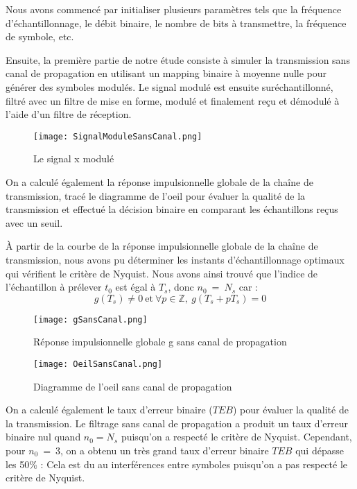 \documentclass[11pt]{article}
\begin{document}
Nous avons commencé par initialiser plusieurs paramètres tels que la fréquence d'échantillonnage, le débit binaire, le nombre de bits à transmettre, la fréquence de symbole, etc.

Ensuite, la première partie de notre étude consiste à simuler la transmission sans canal de propagation en utilisant un mapping binaire à moyenne nulle pour générer des symboles modulés. Le signal modulé est ensuite suréchantillonné, filtré avec un filtre de mise en forme, modulé et finalement reçu et démodulé à l'aide d'un filtre de réception.

\begin{figure}[ht!]
            \centering
            \texttt{[image: SignalModuleSansCanal.png]}
            \caption{Le signal x modulé \label{fig : SignalModuleSansCanal}}
\end{figure}

On a calculé également la réponse impulsionnelle globale de la chaîne de transmission, tracé le diagramme de l'oeil pour évaluer la qualité de la transmission et effectué la décision binaire en comparant les échantillons reçus avec un seuil.

À partir de la courbe de la réponse impulsionnelle globale de la chaîne de transmission, nous avons pu déterminer les instants d'échantillonnage optimaux qui vérifient le critère de Nyquist. Nous avons ainsi trouvé que l'indice de l'échantillon à prélever $t_0$ est égal à $T_s$, donc $n_0 \ = \ N_s$ car :
$$ g(T_s) \neq 0 \
\text{et} \ \forall p \in \mathbb{Z}, \ g(T_s+pT_s) = 0 $$

\begin{figure}[ht!]
            \centering
            \texttt{[image: gSansCanal.png]}
            \caption{Réponse impulsionnelle globale g sans canal de propagation \label{fig : gSansCanal}}
\end{figure}

\begin{figure}[ht!]
            \centering
            \texttt{[image: OeilSansCanal.png]}
            \caption{Diagramme de l'oeil sans canal de propagation\label{fig : OeilSansCanal}}
\end{figure}

On a calculé également le taux d'erreur binaire ($TEB$) pour évaluer la qualité de la transmission. Le filtrage sans canal de propagation a produit un taux d'erreur binaire nul quand $n_0 = N_s$ puisqu'on a respecté le critère de Nyquist. Cependant, pour $n_0 \ = \ 3$, on a obtenu un très grand taux d'erreur binaire $TEB$ qui dépasse les 50\% : Cela est du au interférences entre symboles puisqu'on a pas respecté le critère de Nyquist.
\end{document}

